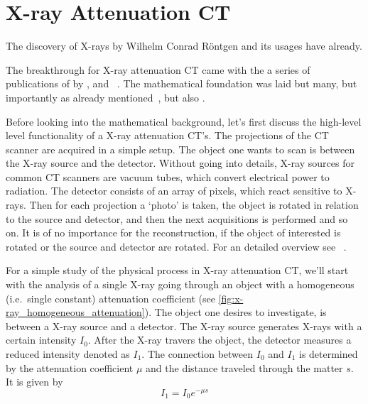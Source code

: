 \section{X-ray Attenuation CT}\label{sec:xray_attenuation_ct}

The discovery of X-rays by Wilhelm Conrad Röntgen  and its
usages have already.

The breakthrough for X-ray attenuation CT came with the a series of publications of by
\citeauthor{hounsfield_computerized_1973}\cite{hounsfield_computerized_1973},
\citeauthor{ambrose_computerized_1973}\cite{ambrose_computerized_1973} and
~\citeauthor{perry_computerized_1973}\cite{perry_computerized_1973}. The mathematical foundation was
laid but many, but importantly as already mentioned~\citeauthor{radon_uber_1917}, but also
\citeauthor{cormack_representation_1963}\cite{cormack_representation_1963}.

Before looking into the mathematical background, let's first discuss the high-level level
functionality of a X-ray attenuation CT's. The projections of the CT scanner are acquired in a
simple setup. The object one wants to scan is between the X-ray source and the detector. Without
going into details, X-ray sources for common CT scanners are vacuum tubes, which convert electrical
power to radiation. The detector consists of an array of pixels, which react sensitive to X-rays.
Then for each projection a `photo' is taken, the object is rotated in relation to the source and
detector, and then the next acquisitions is performed and so on. It is of no importance for the
reconstruction, if the object of interested is rotated or the source and detector are rotated. For
an detailed overview see \citeauthor{buzzy_computed_2008}~\cite[Chapter 2]{buzug_computed_2008}. 


For a simple study of the physical process in X-ray attenuation CT, we'll start with the analysis of
a single X-ray going through an object with a homogeneous (i.e.\ single constant) attenuation
coefficient (see \autoref{fig:x-ray_homogeneous_attenuation}). The object one desires to investigate,
is between a X-ray source and a detector. The X-ray source generates X-rays with a certain intensity
\(I_0\). After the X-ray travers the object, the detector measures a reduced intensity denoted as
\(I_1\). The connection between \(I_0\) and \(I_1\) is determined by the attenuation coefficient
\(\mu\) and the distance traveled through the matter \(s\). It is given by
\[ I_1 = I_0 e^{-\mu s} \]


